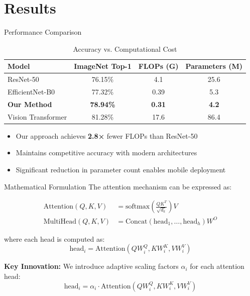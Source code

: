 \documentclass[10pt,aspectratio=169]{beamer}
\begin{document}
\section{Results}

\begin{frame}{Performance Comparison}
\begin{table}
\centering
\caption{Accuracy vs. Computational Cost}
\begin{tabular}{@{}lccc@{}}
\toprule
\textbf{Model} & \textbf{ImageNet Top-1} & \textbf{FLOPs (G)} & \textbf{Parameters (M)} \\
\midrule
ResNet-50 & 76.15\% & 4.1 & 25.6 \\
EfficientNet-B0 & 77.32\% & 0.39 & 5.3 \\
\textbf{Our Method} & \textbf{78.94\%} & \textbf{0.31} & \textbf{4.2} \\
Vision Transformer & 81.28\% & 17.6 & 86.4 \\
\bottomrule
\end{tabular}
\end{table}

\vspace{0.5em}
\begin{itemize}
\item Our approach achieves \textbf{2.8×} fewer FLOPs than ResNet-50
\item Maintains competitive accuracy with modern architectures
\item Significant reduction in parameter count enables mobile deployment
\end{itemize}
\end{frame}

\begin{frame}{Mathematical Formulation}
The attention mechanism can be expressed as:

\begin{align}
\text{Attention}(Q, K, V) &= \text{softmax}\left(\frac{QK^T}{\sqrt{d_k}}\right)V \\
\text{MultiHead}(Q, K, V) &= \text{Concat}(\text{head}_1, \ldots, \text{head}_h)W^O
\end{align}

where each head is computed as:
\begin{equation}
\text{head}_i = \text{Attention}(QW_i^Q, KW_i^K, VW_i^V)
\end{equation}

\vspace{1em}
\textbf{Key Innovation:} We introduce adaptive scaling factors $\alpha_i$ for each attention head:
\begin{equation}
\text{head}_i = \alpha_i \cdot \text{Attention}(QW_i^Q, KW_i^K, VW_i^V)
\end{equation}
\end{frame}
\end{document}
